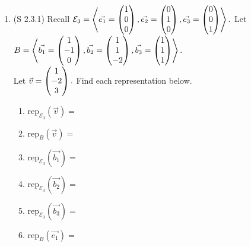 \documentclass[11pt,fleqn]{article}
\begin{document}
\begin{enumerate}
\item (S 2.3.1) Recall $\mathcal{E}_3=\left\langle \vec{e_1}=\begin{pmatrix} 1\\0\\0 \end{pmatrix},\vec{e_2}=\begin{pmatrix} 0\\1\\0\end{pmatrix},\vec{e_3}=\begin{pmatrix} 0\\0\\1 \end{pmatrix} \right\rangle.$ Let $B=\left\langle \vec{b_1}=\begin{pmatrix} 1\\-1\\0\end{pmatrix}, \vec{b_2}=\begin{pmatrix}1\\1\\-2 \end{pmatrix}, \vec{b_3}=\begin{pmatrix} 1\\1\\1\end{pmatrix} \right\rangle.$\\
Let $\vec{v}=\begin{pmatrix} 1\\-2\\3\end{pmatrix}.$ Find each representation below. \\

\begin{multicols}{2}
	\begin{enumerate}
	\item $\text{rep}_{\mathcal{E}_3}(\vec{v})=$\\
	\vspace{1.5in}

	
	\item $\text{rep}_{B}(\vec{v})=$\\
	\vspace{1.5in}
	
	\item  $\text{rep}_{\mathcal{E}_3}(\vec{b_1})=$\\
\vspace{1.5in}

	\item  $\text{rep}_{\mathcal{E}_3}(\vec{b_2})=$\\

	\vspace{1.5in}

	\item  $\text{rep}_{\mathcal{E}_3}(\vec{b_3})=$\\

	\vspace{1.5in}

	\item $\text{rep}_{B}(\vec{e_1})=$\\
	\vspace{1in}


\end{enumerate}
\end{multicols}
\end{enumerate}
\end{document}
